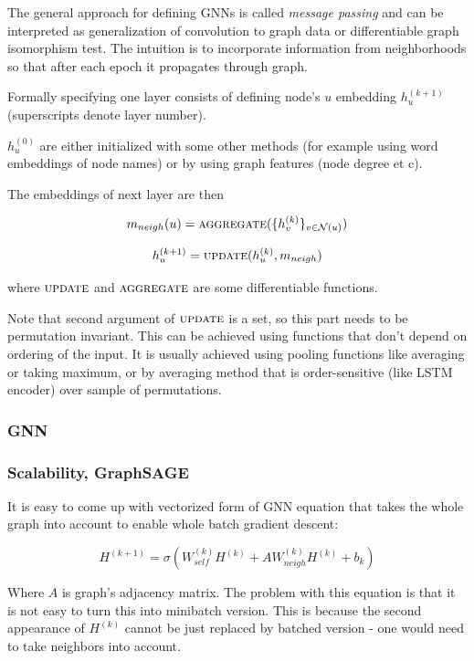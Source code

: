 \documentclass[11pt]{report}
\begin{document}
The general approach for defining GNNs is called \emph{message passing} and can be interpreted as generalization of convolution to graph data or
differentiable graph isomorphism test. The intuition is to incorporate information from neighborhoods so that after each epoch it
propagates through graph.

Formally specifying one layer consists of defining node's \(u\) embedding \(h^{(k+1)}_u\) (superscripts denote layer number).

\(h^{(0)}_u\) are either initialized with some other methods (for example using word embeddings of node names)
or by using graph features (node degree et c).

The embeddings of next layer are then

$$ m_{neigh}(u) = \textsc{aggregate}( \{h^{(k)}_v\}_{v \in \mathcal{N}(u)})$$

$$h^{(k+1)}_u = \textsc{update}(h^{(k)}_u, m_{neigh})$$



where \(\textsc{update}\) and \(\textsc{aggregate}\) are some differentiable functions.

Note that second argument of \(\textsc{update}\) is a set, so this part needs to be permutation invariant.
This can be achieved using functions that don't depend on ordering of the input.
It is usually achieved using pooling functions like averaging or taking maximum, or by averaging method that is order-sensitive (like LSTM encoder) over sample of permutations.

\subsubsection{GNN}
%

\subsubsection{Scalability, GraphSAGE}

It is easy to come up with vectorized form of GNN equation that takes the whole graph into account to enable whole batch gradient descent:

    $$H^{(k+1)} = \sigma(W^{(k)}_{self} H^{(k)} + A W^{(k)}_{neigh} H^{(k)} + b_k)$$


Where \(A\) is graph's adjacency matrix. The problem with this equation is that it is not easy to turn this into minibatch version.
This is because the second appearance of \(H^{(k)}\) cannot be just replaced by batched version - one would need to
take neighbors into account.
\end{document}
